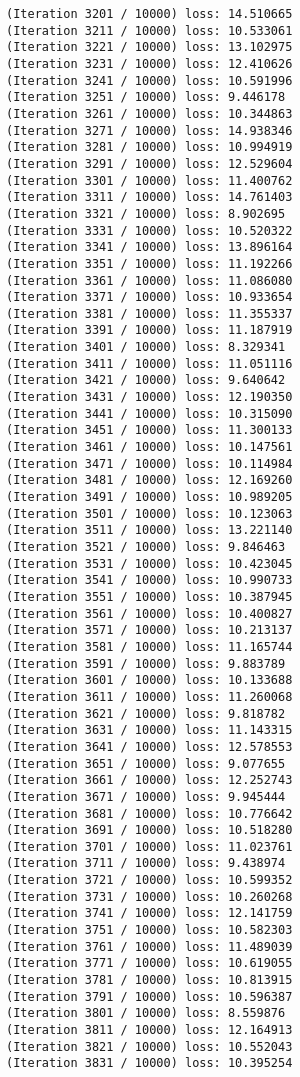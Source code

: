 \documentclass[11pt]{article}
\begin{document}
\begin{Verbatim}[commandchars=\\\{\}]
(Iteration 3201 / 10000) loss: 14.510665
(Iteration 3211 / 10000) loss: 10.533061
(Iteration 3221 / 10000) loss: 13.102975
(Iteration 3231 / 10000) loss: 12.410626
(Iteration 3241 / 10000) loss: 10.591996
(Iteration 3251 / 10000) loss: 9.446178
(Iteration 3261 / 10000) loss: 10.344863
(Iteration 3271 / 10000) loss: 14.938346
(Iteration 3281 / 10000) loss: 10.994919
(Iteration 3291 / 10000) loss: 12.529604
(Iteration 3301 / 10000) loss: 11.400762
(Iteration 3311 / 10000) loss: 14.761403
(Iteration 3321 / 10000) loss: 8.902695
(Iteration 3331 / 10000) loss: 10.520322
(Iteration 3341 / 10000) loss: 13.896164
(Iteration 3351 / 10000) loss: 11.192266
(Iteration 3361 / 10000) loss: 11.086080
(Iteration 3371 / 10000) loss: 10.933654
(Iteration 3381 / 10000) loss: 11.355337
(Iteration 3391 / 10000) loss: 11.187919
(Iteration 3401 / 10000) loss: 8.329341
(Iteration 3411 / 10000) loss: 11.051116
(Iteration 3421 / 10000) loss: 9.640642
(Iteration 3431 / 10000) loss: 12.190350
(Iteration 3441 / 10000) loss: 10.315090
(Iteration 3451 / 10000) loss: 11.300133
(Iteration 3461 / 10000) loss: 10.147561
(Iteration 3471 / 10000) loss: 10.114984
(Iteration 3481 / 10000) loss: 12.169260
(Iteration 3491 / 10000) loss: 10.989205
(Iteration 3501 / 10000) loss: 10.123063
(Iteration 3511 / 10000) loss: 13.221140
(Iteration 3521 / 10000) loss: 9.846463
(Iteration 3531 / 10000) loss: 10.423045
(Iteration 3541 / 10000) loss: 10.990733
(Iteration 3551 / 10000) loss: 10.387945
(Iteration 3561 / 10000) loss: 10.400827
(Iteration 3571 / 10000) loss: 10.213137
(Iteration 3581 / 10000) loss: 11.165744
(Iteration 3591 / 10000) loss: 9.883789
(Iteration 3601 / 10000) loss: 10.133688
(Iteration 3611 / 10000) loss: 11.260068
(Iteration 3621 / 10000) loss: 9.818782
(Iteration 3631 / 10000) loss: 11.143315
(Iteration 3641 / 10000) loss: 12.578553
(Iteration 3651 / 10000) loss: 9.077655
(Iteration 3661 / 10000) loss: 12.252743
(Iteration 3671 / 10000) loss: 9.945444
(Iteration 3681 / 10000) loss: 10.776642
(Iteration 3691 / 10000) loss: 10.518280
(Iteration 3701 / 10000) loss: 11.023761
(Iteration 3711 / 10000) loss: 9.438974
(Iteration 3721 / 10000) loss: 10.599352
(Iteration 3731 / 10000) loss: 10.260268
(Iteration 3741 / 10000) loss: 12.141759
(Iteration 3751 / 10000) loss: 10.582303
(Iteration 3761 / 10000) loss: 11.489039
(Iteration 3771 / 10000) loss: 10.619055
(Iteration 3781 / 10000) loss: 10.813915
(Iteration 3791 / 10000) loss: 10.596387
(Iteration 3801 / 10000) loss: 8.559876
(Iteration 3811 / 10000) loss: 12.164913
(Iteration 3821 / 10000) loss: 10.552043
(Iteration 3831 / 10000) loss: 10.395254

\end{Verbatim}
\end{document}
